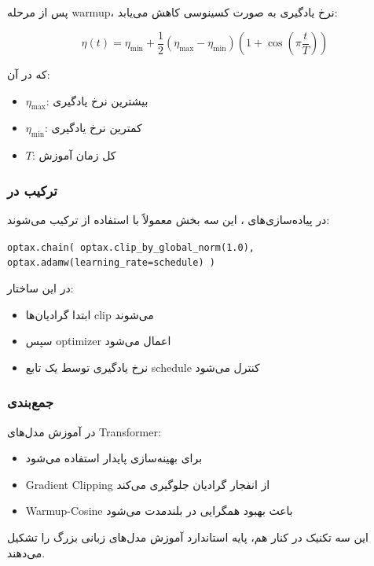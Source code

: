 \documentclass{article}
\begin{document}
پس از مرحله warmup، نرخ یادگیری به صورت کسینوسی کاهش می‌یابد:

\[
\eta(t) = \eta_{\min} + \frac{1}{2}(\eta_{\max} - \eta_{\min})
\left(1 + \cos\left(\pi \frac{t}{T}\right)\right)
\]

که در آن:

\begin{itemize}
	\item \( \eta_{\max} \): بیشترین نرخ یادگیری
	\item \( \eta_{\min} \): کمترین نرخ یادگیری
	\item \( T \): کل زمان آموزش
\end{itemize}

\subsubsection*{ترکیب در }

در پیاده‌سازی‌های ، این سه بخش معمولاً با استفاده از  ترکیب می‌شوند:

\begin{latin}
	\texttt{optax.chain(
		optax.clip\_by\_global\_norm(1.0),
		optax.adamw(learning\_rate=schedule)
		)}
\end{latin}

در این ساختار:

\begin{itemize}
	\item ابتدا گرادیان‌ها clip می‌شوند
	\item سپس optimizer اعمال می‌شود
	\item نرخ یادگیری توسط یک تابع schedule کنترل می‌شود
\end{itemize}

\subsubsection*{جمع‌بندی}

در آموزش مدل‌های Transformer:

\begin{itemize}
	\item {} برای بهینه‌سازی پایدار استفاده می‌شود
	\item Gradient Clipping از انفجار گرادیان جلوگیری می‌کند
	\item Warmup-Cosine باعث بهبود همگرایی در بلندمدت می‌شود
\end{itemize}

این سه تکنیک در کنار هم، پایه استاندارد آموزش مدل‌های زبانی بزرگ را تشکیل می‌دهند.
\end{document}

